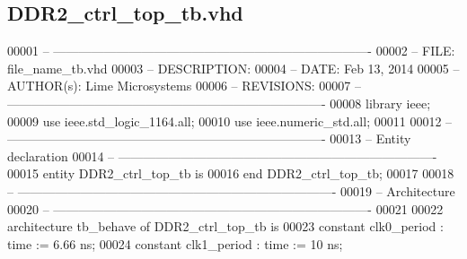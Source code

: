 \subsection{D\+D\+R2\+\_\+ctrl\+\_\+top\+\_\+tb.\+vhd}
\label{DDR2__ctrl__top__tb_8vhd_source}

\begin{DoxyCode}
00001 \textcolor{keyword}{-- ---------------------------------------------------------------------------- }
00002 \textcolor{keyword}{-- FILE:    file\_name\_tb.vhd}
00003 \textcolor{keyword}{-- DESCRIPTION: }
00004 \textcolor{keyword}{-- DATE:    Feb 13, 2014}
00005 \textcolor{keyword}{-- AUTHOR(s):   Lime Microsystems}
00006 \textcolor{keyword}{-- REVISIONS:}
00007 \textcolor{keyword}{-- ---------------------------------------------------------------------------- }
00008 \textcolor{vhdlkeyword}{library }\textcolor{keywordflow}{ieee};
00009 \textcolor{vhdlkeyword}{use }ieee.std\_logic\_1164.\textcolor{keywordflow}{all};
00010 \textcolor{vhdlkeyword}{use }ieee.numeric\_std.\textcolor{keywordflow}{all};
00011 
00012 \textcolor{keyword}{-- ----------------------------------------------------------------------------}
00013 \textcolor{keyword}{-- Entity declaration}
00014 \textcolor{keyword}{-- ----------------------------------------------------------------------------}
00015 \textcolor{keywordflow}{entity }DDR2_ctrl_top_tb \textcolor{keywordflow}{is}
00016 \textcolor{keywordflow}{end} \textcolor{vhdlchar}{DDR2\_ctrl\_top\_tb};
00017 
00018 \textcolor{keyword}{-- ----------------------------------------------------------------------------}
00019 \textcolor{keyword}{-- Architecture}
00020 \textcolor{keyword}{-- ----------------------------------------------------------------------------}
00021 
00022 \textcolor{keywordflow}{architecture} tb\_behave \textcolor{keywordflow}{of} DDR2_ctrl_top_tb is
00023     \textcolor{keywordflow}{constant} \textcolor{vhdlchar}{clk0_period}    \textcolor{vhdlchar}{:} \textcolor{comment}{time} \textcolor{vhdlchar}{:=} \textcolor{vhdllogic}{}\textcolor{vhdllogic}{6}.\textcolor{vhdllogic}{66} \textcolor{vhdlchar}{ns};
00024     \textcolor{keywordflow}{constant} \textcolor{vhdlchar}{clk1_period}    \textcolor{vhdlchar}{:} \textcolor{comment}{time} \textcolor{vhdlchar}{:=} \textcolor{vhdllogic}{}\textcolor{vhdllogic}{10} \textcolor{vhdlchar}{ns}; 

\end{DoxyCode}

